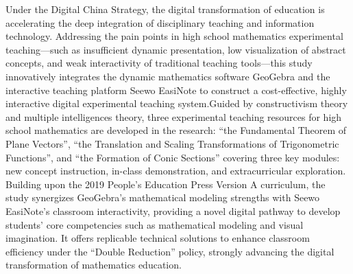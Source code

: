 
\begin{abstract}
数字中国战略背景下，教育数字化转型正加速推进学科教学与信息技术的深度融合。针对高中数学实验教学中动态呈现不足、抽象概念可视化程度低及传统教具互动性弱等痛点，本研究创新性地融合动态数学软件GeoGebra与交互式教学平台希沃白板，构建低成本、高交互的数字化实验教学体系。基于建构主义理论、多元智能理论等理论基础，本研究开发出“平面向量基本定理”、“三角函数图象平移伸缩变换”和“圆锥曲线的形成”三个高中数学实验教学资源，涉及课程新授讲解、课堂实操演示和课外兴趣拓展三大模块。依托2019年人教A版教材，深度整合GeoGebra的数学建模优势与希沃白板的课堂交互特性，为发展学生数学建模、直观想象等核心素养提供新型数字化路径，为“双减”背景下课堂增效提质提供可复制的技术方案，有力助推数学教育数字化转型进程。
\end{abstract}



\begin{abstract*}
Under the Digital China Strategy, the digital transformation of education is accelerating the deep integration of disciplinary teaching and information technology. Addressing the pain points in high school mathematics experimental teaching—such as insufficient dynamic presentation, low visualization of abstract concepts, and weak interactivity of traditional teaching tools—this study innovatively integrates the dynamic mathematics software GeoGebra and the interactive teaching platform Seewo EasiNote to construct a cost-effective, highly interactive digital experimental teaching system.Guided by constructivism theory and multiple intelligences theory, three experimental teaching resources for high school mathematics are developed in the research: ``the Fundamental Theorem of Plane Vectors'', ``the Translation and Scaling Transformations of Trigonometric Functions'', and ``the Formation of Conic Sections'' covering three key modules: new concept instruction, in-class demonstration, and extracurricular exploration. Building upon the 2019 People's Education Press Version A curriculum, the study synergizes GeoGebra's mathematical modeling strengths with Seewo EasiNote's classroom interactivity, providing a novel digital pathway to develop students' core competencies such as mathematical modeling and visual imagination. It offers replicable technical solutions to enhance classroom efficiency under the ``Double Reduction'' policy, strongly advancing the digital transformation of mathematics education.
\end{abstract*}